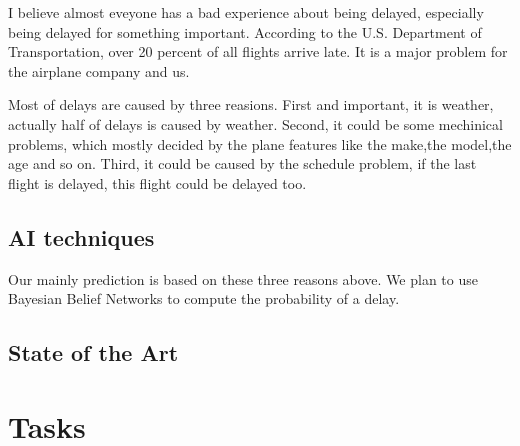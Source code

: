 \documentclass[12pt]{article}
\begin{document}
I believe almost eveyone has a bad experience about being delayed,
especially being delayed for something important. According to the
U.S. Department of Transportation, over 20 percent of all flights
arrive late. It is a major problem for the airplane company and us. 

Most of delays are caused by three reasions. First and important, it
is weather, actually half of delays is caused by weather. Second,
it could be some mechinical problems, which mostly decided by the plane
features like the make,the model,the age and so on. Third, it could be
caused by the schedule problem, if the last flight is delayed, this flight could
be delayed too. 





\subsection{AI techniques}


Our mainly prediction is based on these three reasons above. 
We plan to use Bayesian Belief Networks to compute the probability of a delay.


\subsection{State of the Art}





\section{Tasks}

\end{document}

